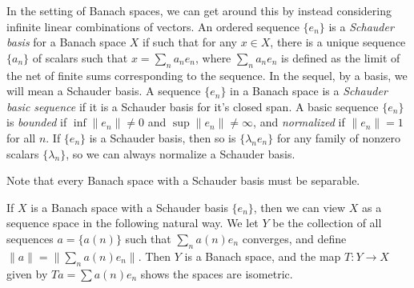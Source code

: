 In the setting of Banach spaces, we can get around this by instead considering infinite linear combinations of vectors. An ordered sequence $\{ e_n \}$ is a \emph{Schauder basis} for a Banach space $X$ if such that for any $x \in X$, there is a unique sequence $\{ a_n \}$ of scalars such that $x = \sum_n a_n e_n$, where $\sum_n a_n e_n$ is defined as the limit of the net of finite sums corresponding to the sequence. In the sequel, by a basis, we will mean a Schauder basis. A sequence $\{ e_n \}$ in a Banach space is a \emph{Schauder basic sequence} if it is a Schauder basis for it's closed span. A basic sequence $\{ e_n \}$ is \emph{bounded} if $\inf \| e_n \| \neq 0$ and $\sup \| e_n \| \neq \infty$, and \emph{normalized} if $\| e_n \| = 1$ for all $n$. If $\{ e_n \}$ is a Schauder basis, then so is $\{ \lambda_n e_n \}$ for any family of nonzero scalars $\{ \lambda_n \}$, so we can always normalize a Schauder basis.

\begin{remark}
    Note that every Banach space with a Schauder basis must be separable.
\end{remark}

If $X$ is a Banach space with a Schauder basis $\{ e_n \}$, then we can view $X$ as a sequence space in the following natural way. We let $Y$ be the collection of all sequences $a = \{ a(n) \}$ such that $\sum_n a(n) e_n$ converges, and define $\| a \| = \| \sum_n a(n) e_n \|$. Then $Y$ is a Banach space, and the map $T: Y \to X$ given by $Ta = \sum a(n) e_n$ shows the spaces are isometric.

